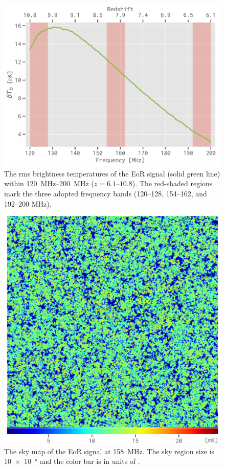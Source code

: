 \documentclass[twocolumn]{aastex62}
\begin{document}
\begin{figure}
  \centering
  \includegraphics[width=\columnwidth]{eos2016-tbrms}
  \caption{\label{fig:eor-tbrms}%
    The rms brightness temperatures of the EoR signal
    (solid green line) within \SIrange{120}{200}{\MHz}
    ($z = \numrange{6.1}{10.8}$).
    The red-shaded regions mark the three adopted frequency bands
    (\numrange{120}{128}, \numrange{154}{162}, and \numrange{192}{200}
    \si{\MHz}).
  }
\end{figure}

\begin{figure}
  \centering
  \includegraphics[width=\columnwidth]{21cm-f158}
  \caption{\label{fig:map-eor}%
    The sky map of the EoR signal at \SI{158}{\MHz}.
    The sky region size is \SI[product-units=repeat]{10 x 10}{\degree}
    and the color bar is in units of \si{\mK}.
  }
\end{figure}
\end{document}
